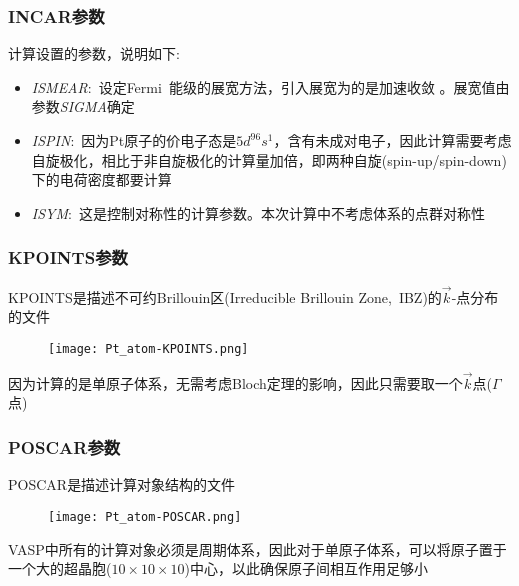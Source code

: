 \frame
{
	\frametitle{\textrm{INCAR}参数}
计算设置的参数，说明如下:~
\begin{itemize}
	\item \textit{ISMEAR}:~设定\textrm{Fermi~}能级的展宽方法，引入展宽为的是加速收敛
		。展宽值由参数\textit{SIGMA}确定
	\item \textit{ISPIN}:~因为\textrm{Pt}原子的价电子态是$5\mathit{d}^96\mathit{s}^1$，含有未成对电子，因此计算需要考虑自旋极化，相比于非自旋极化的计算量加倍，即两种自旋(\textrm{spin-up/spin-down})下的电荷密度都要计算
	\item \textit{ISYM}:~这是控制对称性的计算参数。本次计算中不考虑体系的点群对称性
\end{itemize}
}
\frame
{
	\frametitle{\textrm{KPOINTS}参数}
\textrm{KPOINTS}是描述不可约\textrm{Brillouin}区(\textrm{Irreducible Brillouin Zone,~IBZ})的$\vec k$-点分布的文件%
\begin{figure}[h!]
\centering
\vskip -5pt
\texttt{[image: Pt\_atom-KPOINTS.png]}
\caption{\fontsize{6.2pt}{5.2pt}}%
\label{Pt_atom:KPOINTS}
\end{figure}
因为计算的是单原子体系，无需考虑\textrm{Bloch}定理的影响，因此只需要取一个$\vec k$点($\Gamma$点)
}
\frame
{
	\frametitle{\textrm{POSCAR}参数}
\textrm{POSCAR}是描述计算对象结构的文件%
\begin{figure}[h!]
\centering
\texttt{[image: Pt\_atom-POSCAR.png]}
\caption{\fontsize{6.2pt}{5.2pt}}%
\label{Pt_atom:POSCAR}
\end{figure}
\textrm{VASP}中所有的计算对象必须是周期体系，因此对于单原子体系，可以将原子置于一个大的超晶胞($10\times10\times10$)中心，以此确保原子间相互作用足够小
}
